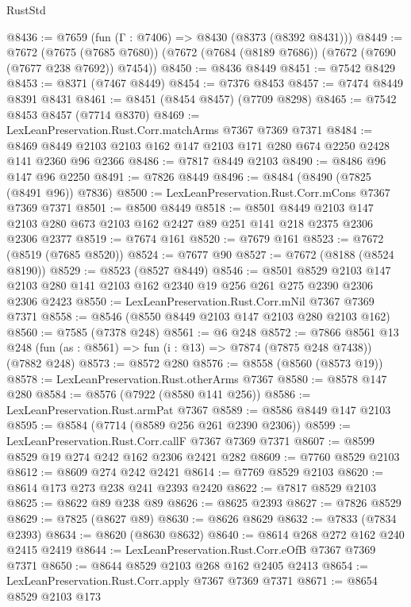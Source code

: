 \begin{lexlean}{RustStd}
\begin{coremodule}
@8436 := @7659 (fun (Γ : @7406) => @8430 (@8373 (@8392 @8431)))
@8449 := @7672
    (@7675 (@7685 @7680))
    (@7672 (@7684 (@8189 @7686)) (@7672 (@7690 (@7677 @238 @7692)) @7454))
@8450 := @8436 @8449
@8451 := @7542 @8429
@8453 := @8371 (@7467 @8449)
@8454 := @7376 @8453
@8457 := @7474 @8449 @8391 @8431
@8461 := @8451 (@8454 @8457) (@7709 @8298)
@8465 := @7542 @8453 @8457 (@7714 @8370)
@8469 := LexLeanPreservation.Rust.Corr.matchArms @7367 @7369 @7371
@8484 := @8469 @8449 @2103 @2103 @162 @147 @2103 @171 @280 @674 @2250 @2428 @141 @2360 @96 @2366
@8486 := @7817 @8449 @2103
@8490 := @8486 @96 @147 @96 @2250
@8491 := @7826 @8449
@8496 := @8484 (@8490 (@7825 (@8491 @96)) @7836)
@8500 := LexLeanPreservation.Rust.Corr.mCons @7367 @7369 @7371
@8501 := @8500 @8449
@8518 := @8501
    @8449
    @2103
    @147
    @2103
    @280
    @673
    @2103
    @162
    @2427
    @89
    @251
    @141
    @218
    @2375
    @2306
    @2306
    @2377
@8519 := @7674 @161
@8520 := @7679 @161
@8523 := @7672 (@8519 (@7685 @8520))
@8524 := @7677 @90
@8527 := @7672 (@8188 (@8524 @8190))
@8529 := @8523 (@8527 @8449)
@8546 := @8501
    @8529
    @2103
    @147
    @2103
    @280
    @141
    @2103
    @162
    @2340
    @19
    @256
    @261
    @275
    @2390
    @2306
    @2306
    @2423
@8550 := LexLeanPreservation.Rust.Corr.mNil @7367 @7369 @7371
@8558 := @8546 (@8550 @8449 @2103 @147 @2103 @280 @2103 @162)
@8560 := @7585 (@7378 @248)
@8561 := @6 @248
@8572 := @7866
    @8561
    @13
    @248
    (fun (as : @8561) => fun (i : @13) => @7874 (@7875 @248 @7438))
    (@7882 @248)
@8573 := @8572 @280
@8576 := @8558 (@8560 (@8573 @19))
@8578 := LexLeanPreservation.Rust.otherArms @7367
@8580 := @8578 @147 @280
@8584 := @8576 (@7922 (@8580 @141 @256))
@8586 := LexLeanPreservation.Rust.armPat @7367
@8589 := @8586 @8449 @147 @2103
@8595 := @8584 (@7714 (@8589 @256 @261 @2390 @2306))
@8599 := LexLeanPreservation.Rust.Corr.callF @7367 @7369 @7371
@8607 := @8599 @8529 @19 @274 @242 @162 @2306 @2421 @282
@8609 := @7760 @8529 @2103
@8612 := @8609 @274 @242 @2421
@8614 := @7769 @8529 @2103
@8620 := @8614 @173 @273 @238 @241 @2393 @2420
@8622 := @7817 @8529 @2103
@8625 := @8622 @89 @238 @89
@8626 := @8625 @2393
@8627 := @7826 @8529
@8629 := @7825 (@8627 @89)
@8630 := @8626 @8629
@8632 := @7833 (@7834 @2393)
@8634 := @8620 (@8630 @8632)
@8640 := @8614 @268 @272 @162 @240 @2415 @2419
@8644 := LexLeanPreservation.Rust.Corr.eOfB @7367 @7369 @7371
@8650 := @8644 @8529 @2103 @268 @162 @2405 @2413
@8654 := LexLeanPreservation.Rust.Corr.apply @7367 @7369 @7371
@8671 := @8654
    @8529
    @2103
    @173

\end{coremodule}
\end{lexlean}

